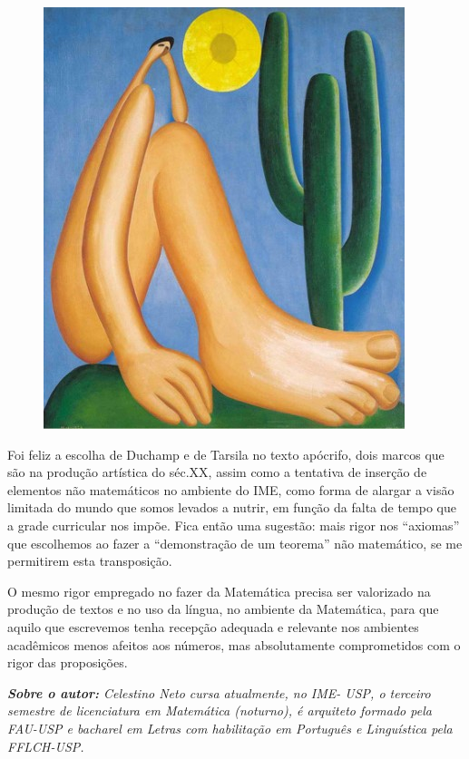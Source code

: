\begin{figure}[H]
    \centering
    \includegraphics[width=0.65\linewidth]{textos/img/tarsila_abaporu.jpg}
    \\
\end{figure}

Foi feliz a escolha de Duchamp e de Tarsila no texto apócrifo, dois marcos que são na produção artística do séc.XX, assim como a tentativa de inserção de elementos não matemáticos no ambiente do IME, como forma de alargar a visão limitada do mundo que somos levados a nutrir, em função da falta de tempo que a grade curricular nos impõe. Fica então uma sugestão: mais rigor nos “axiomas” que escolhemos ao fazer a “demonstração de um teorema” não matemático, se me permitirem esta transposição.

O mesmo rigor empregado no fazer da Matemática precisa ser valorizado na produção de textos e no uso da língua, no ambiente da Matemática, para que aquilo que escrevemos tenha recepção adequada e relevante nos ambientes acadêmicos menos afeitos aos números, mas absolutamente comprometidos com o rigor das proposições.

\emph{\textbf{Sobre o autor:} Celestino Neto cursa atualmente, no IME- USP, o terceiro semestre de licenciatura em Matemática (noturno), é arquiteto formado pela FAU-USP e bacharel em Letras com habilitação em Português e Linguística pela FFLCH-USP.}

\vfill %

